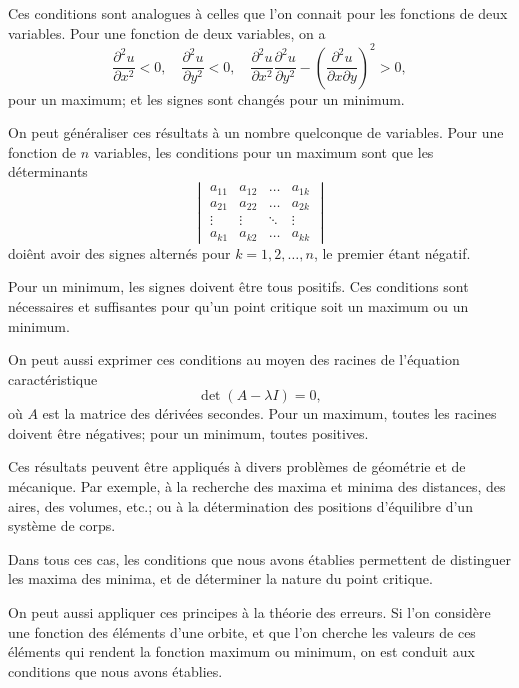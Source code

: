 \documentclass[11pt,a4paper]{book}
\begin{document}
Ces conditions sont analogues \`{a} celles que l'on connait pour les fonctions de deux
variables. Pour une fonction de deux variables, on a
\[
\frac{\partial^2 u}{\partial x^2} < 0, \quad \frac{\partial^2 u}{\partial y^2} < 0, \quad \frac{\partial^2 u}{\partial x^2} \frac{\partial^2 u}{\partial y^2} - \left(\frac{\partial^2 u}{\partial x \partial y}\right)^2 > 0,
\]
pour un maximum; et les signes sont chang\'{e}s pour un minimum.

\newpage
\setcounter{page}{232}

On peut g\'{e}n\'{e}raliser ces r\'{e}sultats \`{a} un nombre quelconque de variables. Pour une
fonction de $n$ variables, les conditions pour un maximum sont que les d\'{e}terminants
\[
\begin{vmatrix}
a_{11} & a_{12} & \ldots & a_{1k} \\
a_{21} & a_{22} & \ldots & a_{2k} \\
\vdots & \vdots & \ddots & \vdots \\
a_{k1} & a_{k2} & \ldots & a_{kk}
\end{vmatrix}
\]
doi\^{e}nt avoir des signes altern\'{e}s pour $k=1, 2, \ldots, n$, le premier \'{e}tant n\'{e}gatif.

\newpage
\setcounter{page}{233}

Pour un minimum, les signes doivent \^{e}tre tous positifs. Ces conditions sont
n\'{e}cessaires et suffisantes pour qu'un point critique soit un maximum ou un minimum.

On peut aussi exprimer ces conditions au moyen des racines de l'\'{e}quation caract\'{e}ristique
\[
\det(A - \lambda I) = 0,
\]
o\`{u} $A$ est la matrice des d\'{e}riv\'{e}es secondes. Pour un maximum, toutes les racines doivent
\^{e}tre n\'{e}gatives; pour un minimum, toutes positives.

\newpage
\setcounter{page}{234}

Ces r\'{e}sultats peuvent \^{e}tre appliqu\'{e}s \`{a} divers probl\`{e}mes de g\'{e}om\'{e}trie et de m\'{e}canique.
Par exemple, \`{a} la recherche des maxima et minima des distances, des aires, des
volumes, etc.; ou \`{a} la d\'{e}termination des positions d'\'{e}quilibre d'un syst\`{e}me de corps.

Dans tous ces cas, les conditions que nous avons \'{e}tablies permettent de distinguer
les maxima des minima, et de d\'{e}terminer la nature du point critique.

\newpage
\setcounter{page}{235}

On peut aussi appliquer ces principes \`{a} la th\'{e}orie des erreurs. Si l'on consid\`{e}re
une fonction des \'{e}l\'{e}ments d'une orbite, et que l'on cherche les valeurs de ces \'{e}l\'{e}ments
qui rendent la fonction maximum ou minimum, on est conduit aux conditions que
nous avons \'{e}tablies.
\end{document}
